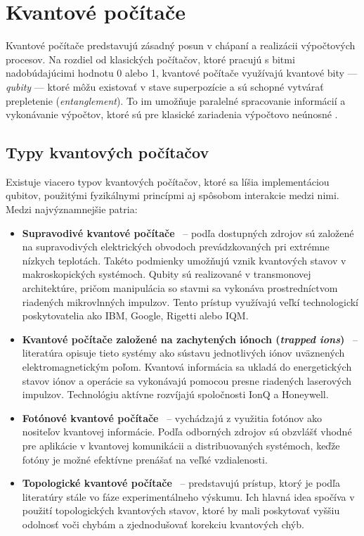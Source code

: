 
\chapter{Kvantové počítače}\label{ch:quantum_computers}

Kvantové počítače predstavujú zásadný posun v chápaní a realizácii výpočtových procesov. Na rozdiel od klasických počítačov, ktoré pracujú s bitmi nadobúdajúcimi hodnotu 0 alebo 1, kvantové počítače využívajú kvantové bity — \textit{qubity} — ktoré môžu existovať v stave superpozície a sú schopné vytvárať prepletenie (\textit{entanglement}). To im umožňuje paralelné spracovanie informácií a vykonávanie výpočtov, ktoré sú pre klasické zariadenia výpočtovo neúnosné \cite{Gill2020_QuantumComputingTaxonomy}.

\section{Typy kvantových počítačov}\label{sec:typy-kvantovych-pocitacov}

Existuje viacero typov kvantových počítačov, ktoré sa líšia implementáciou qubitov, použitými fyzikálnymi princípmi aj spôsobom interakcie medzi nimi. Medzi najvýznamnejšie patria:

\begin{itemize}
  \item \textbf{Supravodivé kvantové počítače}~\cite{AdvancementsSQC2025} – podľa dostupných zdrojov sú založené na supravodivých elektrických obvodoch prevádzkovaných pri extrémne nízkych teplotách. Takéto podmienky umožňujú vznik kvantových stavov v makroskopických systémoch. Qubity sú realizované v transmonovej architektúre, pričom manipulácia so stavmi sa vykonáva prostredníctvom riadených mikrovlnných impulzov. Tento prístup využívajú veľkí technologickí poskytovatelia ako IBM, Google, Rigetti alebo IQM.

  \item \textbf{Kvantové počítače založené na zachytených iónoch (\textit{trapped ions})}~\cite{Wineland1998_trapped_ion_primer} – literatúra opisuje tieto systémy ako sústavu jednotlivých iónov uväznených elektromagnetickým poľom. Kvantová informácia sa ukladá do energetických stavov iónov a operácie sa vykonávajú pomocou presne riadených laserových impulzov. Technológiu aktívne rozvíjajú spoločnosti IonQ a Honeywell.

  \item \textbf{Fotónové kvantové počítače}~\cite{Slussarenko2019_photonic_review} – vychádzajú z využitia fotónov ako nositeľov kvantovej informácie. Podľa odborných zdrojov sú obzvlášť vhodné pre aplikácie v kvantovej komunikácii a distribuovaných systémoch, keďže fotóny je možné efektívne prenášať na veľké vzdialenosti.

  \item \textbf{Topologické kvantové počítače}~\cite{Nayak2007_nonabelian_anyons} – predstavujú prístup, ktorý je podľa literatúry stále vo fáze experimentálneho výskumu. Ich hlavná idea spočíva v použití topologických kvantových stavov, ktoré by mali poskytovať vyššiu odolnosť voči chybám a zjednodušovať korekciu kvantových chýb.
\end{itemize}

